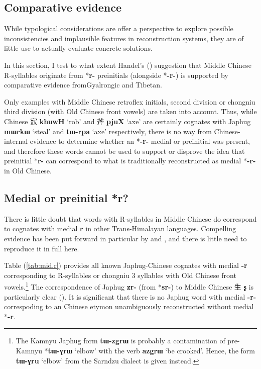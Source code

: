 \documentclass[oneside,a4paper,11pt]{article}
\newcommand{\ipa}[1]{{\phon\mbox{\textbf{#1}}}}
\newcommand{\zh}[1]{{\cn #1}}
\newcommand{\ch}[3]{\zh{#1} \ipa{#2} `#3'}
\begin{document}
\subsection{Comparative evidence}
While typological considerations are offer a perspective to explore possible inconsistencies and implausible features in reconstruction systems, they are of little use to actually evaluate concrete solutions.

In this section, I test to what extent Handel's (\citeyear{handel02r}) suggestion that Middle Chinese R-syllables originate from *\ipa{r-} preinitials (alongside *\ipa{-r-}) is supported by comparative evidence fromGyalrongic and Tibetan.

Only examples with Middle Chinese retroflex initials, second division or chongniu third division (with Old Chinese front vowels) are taken into account. Thus, while Chinese \ch{寇}{khuwH}{rob} and \ch{斧}{pjuX}{axe} are certainly cognates with Japhug \ipa{mɯrkɯ} `steal' and \ipa{tɯ-rpa} `axe' respectively, there is no way from Chinese-internal evidence to determine whether an *\ipa{-r-} medial or preinitial was present, and therefore these words cannot be used to support or disprove the idea that preinitial *\ipa{r-} can correspond to what is traditionally reconstructed as medial *\ipa{-r-} in Old Chinese.


\subsection{Medial or preinitial *r?}
There is little doubt that words with R-syllables in Middle Chinese do correspond to cognates with medial \ipa{r} in other Trans-Himalayan languages. Compelling evidence has been put forward in particular by \citet{coblin86handlist} and \citet{gong95st}, and there is little need to reproduce it in full here.

Table (\ref{tab:mid.r}) provides all known Japhug-Chinese cognates with medial \ipa{-r} corresponding to R-syllables or chongniu 3 syllables with Old Chinese front vowels.\footnote{The Kamnyu Japhug form \ipa{tɯ-zgrɯ} is probably a contamination of  pre-Kamnyu *\ipa{tɯ-ɣrɯ} `elbow' with the verb \ipa{azgrɯ} `be crooked'. Hence, the form \ipa{tɯ-ɣru} `elbow' from the Sarndzu dialect is given instead.} The correspondence of Japhug \ipa{zr-} (from *\ipa{sr-}) to Middle Chinese \zh{生} \ipa{ʂ} is particularly clear (\citealt{jacques15sr}). It is significant that there is no Japhug word with medial \ipa{-r-} correspoding to an Chinese etymon unambiguously reconstructed without medial *\ipa{-r}.
\end{document}
